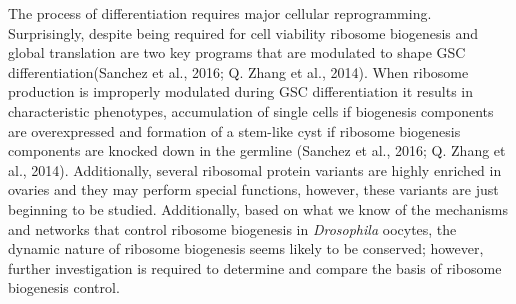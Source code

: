 \documentclass[12pt,oneside]{reedthesis}
\begin{document}
The process of differentiation requires major cellular reprogramming.
Surprisingly, despite being required for cell viability ribosome
biogenesis and global translation are two key programs that are
modulated to shape GSC differentiation(Sanchez et al., 2016; Q. Zhang et al., 2014).
When ribosome production is improperly modulated during GSC
differentiation it results in characteristic phenotypes, accumulation of
single cells if biogenesis components are overexpressed and formation of
a stem-like cyst if ribosome biogenesis components are knocked down in
the germline (Sanchez et al., 2016; Q. Zhang et al., 2014). Additionally, several
ribosomal protein variants are highly enriched in ovaries and they may
perform special functions, however, these variants are just beginning to
be studied. Additionally, based on what we know of the mechanisms and
networks that control ribosome biogenesis in \emph{Drosophila} oocytes, the
dynamic nature of ribosome biogenesis seems likely to be conserved;
however, further investigation is required to determine and compare the
basis of ribosome biogenesis control.
\end{document}
